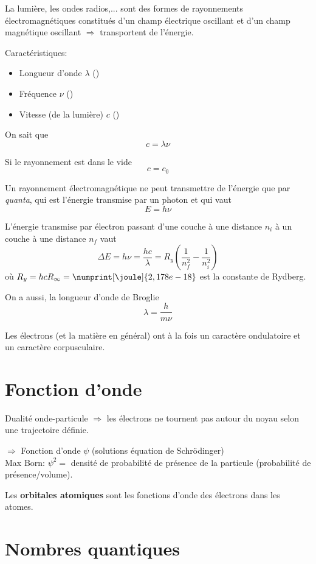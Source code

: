 La lumière, les ondes radios,... sont des formes de rayonnements électromagnétiques constitués d'un champ électrique oscillant et d'un champ magnétique oscillant $\Rightarrow$ transportent de l'énergie.

Caractéristiques:
\begin{itemize}
	\item Longueur d'onde $\lambda$ (\meter)
	\item Fréquence $\nu$ (\hertz)
	\item Vitesse (de la lumière) $c$ (\meter\per\second)
\end{itemize}

On sait que
\[ c = \lambda \nu \]

Si le rayonnement est dans le vide
\[ c = c_0 \]

Un rayonnement électromagnétique ne peut transmettre de l'énergie que par {\it quanta}, qui est l'énergie transmise par un photon et qui vaut
\[ E = h\nu \]

L'énergie transmise par électron passant d'une couche à une distance $n_i$ à un couche à une distance $n_f$ vaut
\[ \Delta E = h\nu = \frac{hc}{\lambda} = R_y \left( \frac{1}{n_f^2} - \frac{1}{n_i^2} \right) \]
où $R_y = hc R_\infty = \numprint[\joule]{2,178e-18}$ est la constante de Rydberg.

On a aussi, la longueur d'onde de Broglie
\[ \lambda = \frac{h}{m\nu} \]

Les électrons (et la matière en général) ont à la fois un caractère ondulatoire et un caractère corpusculaire.


\section{Fonction d'onde}

Dualité onde-particule $\Rightarrow$ les électrons ne tournent pas autour du noyau selon une trajectoire définie.

$\Rightarrow$ Fonction d'onde $\psi$ (solutions équation de Schrödinger)\\

Max Born: $\psi^2 = $ densité de probabilité de présence de la particule (probabilité de présence/volume).

Les \textbf{orbitales atomiques} sont les fonctions d'onde des électrons dans les atomes.

\section{Nombres quantiques}

